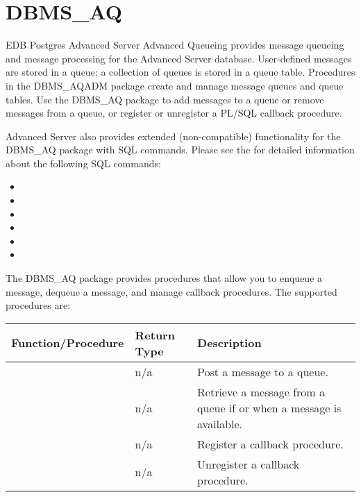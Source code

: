 \documentclass[letterpaper,10pt,english,openany,oneside]{sphinxmanual}
\begin{document}
\newpage


\section{DBMS\_AQ}
\label{\detokenize{dbms_aq::doc}}\label{\detokenize{dbms_aq:dbms-aq}}
EDB Postgres Advanced Server Advanced Queueing provides message queueing
and message processing for the Advanced Server database. User-defined
messages are stored in a queue; a collection of queues is stored in a
queue table. Procedures in the DBMS\_AQADM package create and manage
message queues and queue tables. Use the DBMS\_AQ package to add
messages to a queue or remove messages from a queue, or register or
unregister a PL/SQL callback procedure.

Advanced Server also provides extended (non-compatible) functionality
for the DBMS\_AQ package with SQL commands. Please see the  for detailed
information about the following SQL commands:
\begin{itemize}
\item {} 

\item {} 

\item {} 

\item {} 

\item {} 

\item {} 

\end{itemize}

The DBMS\_AQ package provides procedures that allow you to enqueue a
message, dequeue a message, and manage callback procedures. The
supported procedures are:


\begin{savenotes}\sphinxattablestart
\centering
\begin{tabulary}{\linewidth}[t]{|T|T|T|}
\hline

Function/Procedure
&
Return Type
&
Description
\\
\hline
{}
&
n/a
&
Post a message to a queue.
\\
\hline
{}
&
n/a
&
Retrieve a message from a queue if or when a message is available.
\\
\hline
{}
&
n/a
&
Register a callback procedure.
\\
\hline
{}
&
n/a
&
Unregister a callback procedure.
\\
\hline
\end{tabulary}
\par
\sphinxattableend\end{savenotes}
\end{document}
